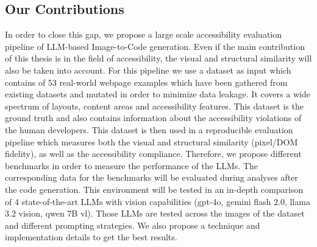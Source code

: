 \subsection{Our Contributions}
In order to close this gap, we propose a large scale accessibility evaluation pipeline of LLM-based
Image-to-Code generation. Even if the main contribution of this thesis is in the field 
of accessibility, the visual and structural similarity will also be taken into account.\newline
For this pipeline we use a dataset as input which contains of 53 real-world webpage 
examples which have been gathered from existing datasets and mutated in 
order to minimize data leakage. It covers a wide spectrum of layouts, content 
areas and accessibility features. This dataset is the ground truth and also contains 
information about the accessibility violations of the human developers.\newline
This dataset is then used in a reproducible evaluation pipeline which 
measures both the visual and structural similarity (pixel/DOM fidelity), as well as the 
accessibility compliance. Therefore, we propose different benchmarks in 
order to measure the performance of the LLMs. The corresponding data for the benchmarks
will be evaluated during analyses after the code generation.\newline
This environment will be tested in an in-depth comparison of 4 state-of-the-art LLMs 
with vision capabilities (gpt-4o, gemini flash 2.0, llama 3.2 vision, qwen 7B vl).
Those LLMs are tested across the images of the dataset and different prompting 
strategies. We also propose a technique and implementation details to get the best 
results.




